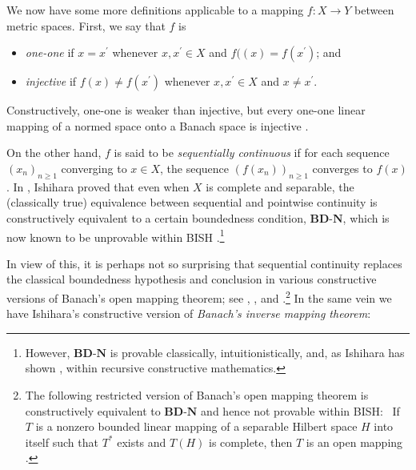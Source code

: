 \documentclass[11pt]{article}%
\begin{document}
\medskip


We now have some more definitions applicable to a mapping $f:X\rightarrow Y$
between metric spaces. First, we say that $f$ is

\begin{itemize}
\item[$\bullet$] \emph{one-one} if $x=x^{\prime}$ whenever $x,x^{\prime}\in X$
and $f((x)=f(x^{\prime})$; and

\item[$\bullet$] \emph{injective }if $f(x)\neq f(x^{\prime})$ whenever
$x,x^{\prime}\in X$ and $x\neq x^{\prime}$.
\end{itemize}

%

\noindent
Constructively, one-one is weaker than injective, but every one-one linear
mapping of a normed space onto a Banach space is injective \cite[Cor.
0]{BI1990}.

On the other hand, $f$ is said to be \emph{sequentially continuous }if for
each sequence $\left(  x_{n}\right)  _{n\geq1}$ converging to $x\in X$, the
sequence $\left(  f(x_{n})\right)  _{n\geq1}$ converges to $f(x)$. In
\cite[Thm. 4]{Ish1992}, Ishihara proved that even when $X$ is complete and
separable, the (classically true) equivalence between sequential and pointwise
continuity is constructively equivalent to a certain boundedness condition,
\textbf{BD}-$\mathbf{N}$, which is now known to be unprovable within BISH
\cite{Lietz}.\footnote{%
\normalfont\sf
However, \textbf{BD}-$\mathbf{N}$ is provable classically, intuitionistically,
and, as Ishihara has shown \cite[Propn. 4]{Ish1992}, within recursive
constructive mathematics.}

In view of this, it is perhaps not so surprising that sequential continuity
replaces the classical boundedness hypothesis and conclusion in various
constructive versions of Banach's open mapping theorem; see \cite[Cor.
1]{Ish1994}, \cite[Thm 4]{BI1998}, and \cite[6.6.4]{BVtech}.\footnote{%
\normalfont\sf
The following restricted version of Banach's open mapping theorem is
constructively equivalent to \textbf{BD}-$\mathbf{N}$ and hence not provable
within BISH: \ If $T$ is a nonzero bounded linear mapping of a separable
Hilbert space $H$ into itself such that $T^{\ast}$ exists and $T(H)$ is
complete, then $T$ is an open mapping \cite[Thm 5]{BI1998}.} In the same vein
we have Ishihara's constructive version of \emph{Banach's inverse mapping
theorem}:
\end{document}
